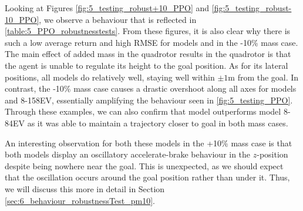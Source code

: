 Looking at Figures \ref{fig:5_testing_robust+10_PPO} and \ref{fig:5_testing_robust-10_PPO}, we observe a behaviour that is reflected in \cref{table:5_PPO_robustnesstests}. From these figures, it is also clear why there is such a low average return and high RMSE for models \six and \ten in the -10\% mass case. The main effect of added mass in the quadrotor results in the quadrotor is that the agent is unable to regulate its height to the goal position. As for its lateral positions, all models do relatively well, staying well within $\pm 1$m from the goal. In contrast, the -10\% mass case causes a drastic overshoot along all axes for models \six and 8-158EV, essentially amplifying the behaviour seen in \cref{fig:5_testing_PPO}. 
Through these examples, we can also confirm that model \ten outperforms model 8-84EV as it was able to maintain a trajectory closer to goal in both mass cases.

An interesting observation for both these models in the +10\% mass case is that both models display an oscillatory accelerate-brake behaviour in the $z$-position despite being nowhere near the goal. This is unexpected, as we should expect that the oscillation occurs around the goal position rather than under it. Thus, we will discuss this more in detail in Section \ref{sec:6_behaviour_robustnessTest_pm10}.


